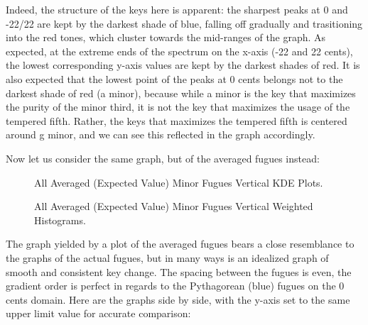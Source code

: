 Indeed, the structure of the keys here is apparent: the sharpest peaks
at 0 and -22/22 are kept by the darkest shade of blue, falling off
gradually and trasitioning into the red tones, which cluster towards the
mid-ranges of the graph. As expected, at the extreme ends of the
spectrum on the x-axis (-22 and 22 cents), the lowest corresponding
y-axis values are kept by the darkest shades of red. It is also expected
that the lowest point of the peaks at 0 cents belongs not to the darkest
shade of red (a minor), because while a minor is the key that maximizes
the purity of the minor third, it is not the key that maximizes the
usage of the tempered fifth. Rather, the keys that maximizes the
tempered fifth is centered around g minor, and we can see this reflected
in the graph accordingly.

Now let us consider the same graph, but of the averaged fugues instead:




\begin{figure}[H]
\vspace{1.5em}
    \centering
    \caption{All Averaged (Expected Value) Minor Fugues Vertical KDE Plots. }
\end{figure}


\begin{figure}[H]
\vspace{1.5em}
    \centering
    \caption{All Averaged (Expected Value) Minor Fugues Vertical Weighted Histograms. }
\end{figure}    The graph yielded by a plot of the averaged fugues bears a close
resemblance to the graphs of the actual fugues, but in many ways is an
idealized graph of smooth and consistent key change. The spacing between
the fugues is even, the gradient order is perfect in regards to the
Pythagorean (blue) fugues on the 0 cents domain. Here are the graphs
side by side, with the y-axis set to the same upper limit value for
accurate comparison:


    \begin{center}
    \end{center}
    


